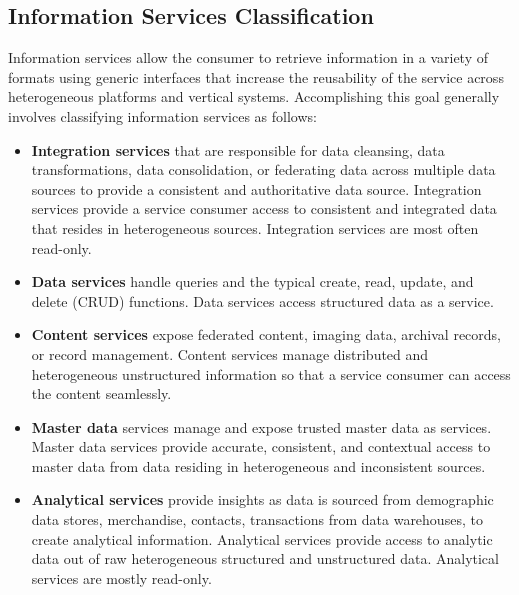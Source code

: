 \documentclass[12pt,a4paper,final,twoside,onecolumn,titlepage]{book}
\begin{document}
\subsection{Information Services Classification}
Information services allow the consumer to retrieve information in a variety of formats using generic interfaces that increase the reusability of the service across heterogeneous platforms and vertical systems. Accomplishing this goal generally involves classifying information services as follows:
\begin{itemize}
\item \textbf{Integration services} that are responsible for data cleansing, data transformations, data consolidation, or federating data across multiple data sources to provide a consistent and authoritative data source. Integration services provide a service consumer access to consistent and integrated data that resides in heterogeneous sources. Integration services are most often read-only.
\item \textbf{Data services} handle queries and the typical create, read, update, and delete (CRUD) functions. Data services access structured data as a service.
\item \textbf{Content services} expose federated content, imaging data, archival records, or record management. Content services manage distributed and heterogeneous unstructured information so that a service consumer can access the content seamlessly.
\item \textbf{Master data} services manage and expose trusted master data as services. Master data services provide accurate, consistent, and contextual access to master data from data residing in heterogeneous and inconsistent sources.
\item \textbf{Analytical services} provide insights as data is sourced from demographic data stores, merchandise, contacts, transactions from data warehouses, to create analytical information. Analytical services provide access to analytic data out of raw heterogeneous structured and unstructured data. Analytical services are mostly read-only.
\end{itemize}
\end{document}
